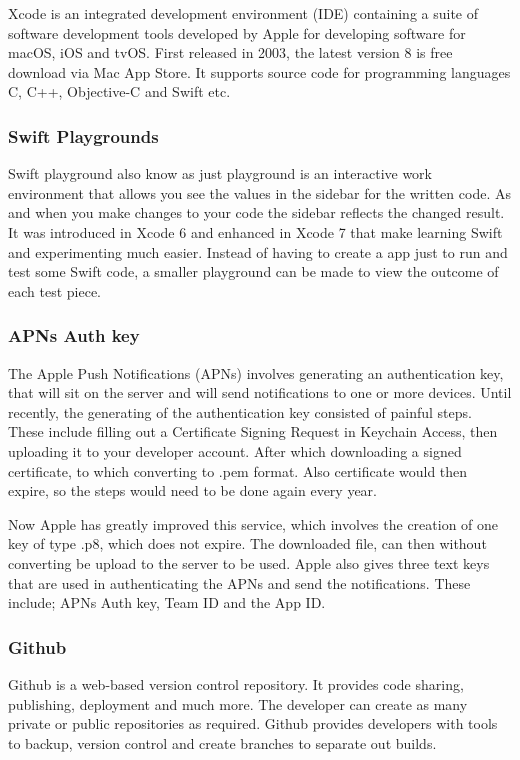 Xcode is an integrated development environment (IDE) containing a suite of software development tools developed by Apple for developing software for macOS, iOS and tvOS. First released in 2003, the latest version 8 is free download via Mac App Store. It supports source code for programming languages C, C++, Objective-C and Swift etc. 

\subsubsection{Swift Playgrounds}

Swift playground also know as just playground is an interactive work environment that allows you see the values in the sidebar for the written code. As and when you make changes to your code the sidebar reflects the changed result. It was introduced in Xcode 6 and enhanced in Xcode 7 that make learning Swift and experimenting much easier. Instead of having to create a app just to run and test some Swift code, a smaller playground can be made to view the outcome of each test piece. 

\subsubsection{APNs Auth key}

The Apple Push Notifications (APNs) involves generating an authentication key, that will sit on the server and will send notifications to one or more devices. Until recently, the generating of the authentication key consisted of painful steps. These include filling out a Certificate Signing Request in Keychain Access, then uploading it to your developer account. After which downloading a signed certificate, to which converting to .pem format. Also certificate would then expire, so the steps would need to be done again every year.

Now Apple has greatly improved this service, which involves the creation of one key of type .p8, which does not expire. The downloaded file, can then without converting be upload to the server to be used. Apple also gives three text keys that are used in authenticating the APNs and send the notifications. These include; APNs Auth key, Team ID and the App ID.

\subsubsection{Github}

Github \cite{github} is a web-based version control repository. It provides code sharing, publishing, deployment and much more. The developer can create as many private or public repositories as required. Github provides developers with tools to backup, version control and create branches to separate out builds.

